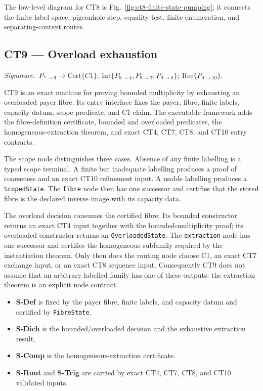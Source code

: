 \documentclass[
  11pt,
]{article}
\providecommand{\tightlist}{%
  \setlength{\itemsep}{0pt}\setlength{\parskip}{0pt}}
\theoremstyle{definition}
\newcommand{\ctsignature}[1]{\par\noindent\emph{Signature.}\ #1\par\medskip}
\newcommand{\ctcert}[1]{\mathrm{Cert}\{#1\}}
\newcommand{\ctint}[1]{\mathrm{Int}\{#1\}}
\newcommand{\ctrec}[1]{\mathrm{Rec}\{#1\}}
\begin{document}
The low-level diagram for CT8 is Fig.~\ref{fig:ct8-finite-state-pumping};
it connects the finite label space, pigeonhole step, equality test,
finite enumeration, and separating-context routes.



\subsection{CT9 --- Overload exhaustion}\label{ct:9}\label{the-charging-principle-in-general-form}
\ctsignature{\(P_{\ast\to9}\to \ctcert{C1};\ \ctint{P_{9\to4},P_{9\to7},P_{9\to8}};\ \ctrec{P_{9\to10}}\).}

CT9 is an exact machine for proving bounded multiplicity by exhausting an
overloaded payer fibre.  Its entry interface fixes the payer, fibre, finite
labels, capacity datum, scope predicate, and C1 claim.  The executable
framework adds the fibre-definition certificate, bounded and overloaded
predicates, the homogeneous-extraction theorem, and exact CT4, CT7, CT8, and
CT10 entry contracts.

The scope node distinguishes three cases.  Absence of any finite labelling is
a typed scope terminal.  A finite but inadequate labelling produces a proof of
coarseness and an exact CT10 refinement input.  A usable labelling produces a
\texttt{ScopedState}.  The \texttt{fibre} node then has one successor and
certifies that the stored fibre is the declared inverse image with its
capacity data.

The overload decision consumes the certified fibre.  Its bounded constructor
returns an exact CT4 input together with the bounded-multiplicity proof; its
overloaded constructor returns an \texttt{OverloadedState}.  The
\texttt{extraction} node has one successor and certifies the homogeneous
subfamily required by the instantiation theorem.  Only then does the routing
node choose C1, an exact CT7 exchange input, or an exact CT8 sequence input.
Consequently CT9 does not assume that an arbitrary labelled family has one of
these outputs: the extraction theorem is an explicit node contract.

\begin{itemize}
\tightlist
\item \textbf{S-Def} is fixed by the payer fibre, finite labels, and capacity datum and certified by \texttt{FibreState}.
\item \textbf{S-Dich} is the bounded/overloaded decision and the exhaustive extraction result.
\item \textbf{S-Comp} is the homogeneous-extraction certificate.
\item \textbf{S-Rout} and \textbf{S-Trig} are carried by exact CT4, CT7, CT8, and CT10 validated inputs.
\end{itemize}
\end{document}
